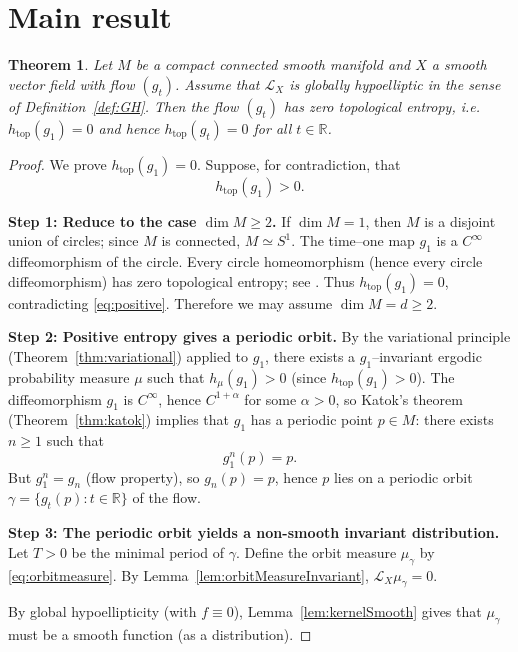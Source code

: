 \documentclass[11pt]{article}
\newtheorem{theorem}{Theorem}
\theoremstyle{definition}
\theoremstyle{remark}
\newcommand{\Lie}{\mathcal{L}}
\newcommand{\htop}{h_{\mathrm{top}}}
\begin{document}
\section{Main result}

\begin{theorem}\label{thm:main}
Let $M$ be a compact connected smooth manifold and $X$ a smooth vector field with flow $(g_t)$.
Assume that $\Lie_X$ is globally hypoelliptic in the sense of Definition~\ref{def:GH}.
Then the flow $(g_t)$ has zero topological entropy, i.e.\ $\htop(g_1)=0$ and hence $\htop(g_t)=0$ for all $t\in\mathbb{R}$.
\end{theorem}

\begin{proof}
We prove $\htop(g_1)=0$. Suppose, for contradiction, that
\begin{equation}\label{eq:positive}
 \htop(g_1)>0.
\end{equation}

\smallskip\noindent\textbf{Step 1: Reduce to the case $\dim M\ge 2$.}
If $\dim M=1$, then $M$ is a disjoint union of circles; since $M$ is connected, $M\simeq S^1$.
The time--one map $g_1$ is a $C^\infty$ diffeomorphism of the circle. Every circle homeomorphism (hence every circle diffeomorphism)
has zero topological entropy; see \cite[Example 7.3.3 and Theorem 7.4]{Walters}.
Thus $\htop(g_1)=0$, contradicting \eqref{eq:positive}. Therefore we may assume $\dim M=d\ge 2$.

\smallskip\noindent\textbf{Step 2: Positive entropy gives a periodic orbit.}
By the variational principle (Theorem~\ref{thm:variational}) applied to $g_1$, there exists a $g_1$--invariant ergodic probability
measure $\mu$ such that $h_\mu(g_1)>0$ (since $\htop(g_1)>0$).
The diffeomorphism $g_1$ is $C^\infty$, hence $C^{1+\alpha}$ for some $\alpha>0$, so Katok's theorem (Theorem~\ref{thm:katok})
implies that $g_1$ has a periodic point $p\in M$:
there exists $n\ge 1$ such that
\[
g_1^n(p)=p.
\]
But $g_1^n=g_n$ (flow property), so $g_n(p)=p$, hence $p$ lies on a periodic orbit $\gamma=\{g_t(p):t\in\mathbb{R}\}$ of the flow.

\smallskip\noindent\textbf{Step 3: The periodic orbit yields a non-smooth invariant distribution.}
Let $T>0$ be the minimal period of $\gamma$.
Define the orbit measure $\mu_\gamma$ by \eqref{eq:orbitmeasure}.
By Lemma~\ref{lem:orbitMeasureInvariant}, $\Lie_X\mu_\gamma=0$.

By global hypoellipticity (with $f\equiv 0$), Lemma~\ref{lem:kernelSmooth} gives that $\mu_\gamma$ must be a smooth function
(as a distribution).


\end{proof}
\end{document}
